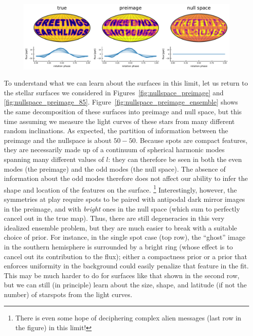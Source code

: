 \documentclass[modern]{aastex62}
\begin{document}
\begin{figure}[p!]
\begin{centering}
        \\[1em]
        \includegraphics[width=\linewidth]{figures/nullspace_preimage_d.pdf}
    \end{centering}
\end{figure}

To understand what we can learn about the surfaces in this limit, let us
return to the stellar surfaces we considered in Figures~\ref{fig:nullspace_preimage}
and \ref{fig:nullspace_preimage_85}.
Figure~\ref{fig:nullspace_preimage_ensemble} shows the same decomposition of
these surfaces into preimage and null space, but this time assuming we measure
the light curves of these stars from many different random inclinations.
As expected, the partition of information between the preimage and the nullspace
is about $50{-}50$.
Because spots are compact features, they
are necessarily made up of a continuum of spherical harmonic modes spanning
many different values of $l$: they can therefore be seen in both the even
modes (the preimage) and the odd modes (the null space). The absence of
information about the odd modes therefore does not affect our ability to
infer the shape and location of the features on the surface.%
\footnote{
    There is even some hope of deciphering complex alien messages
    (last row in the figure) in this limit!
}
Interestingly, however,
the symmetries at play require spots to be paired with antipodal dark mirror
images in the preimage, and with \emph{bright} ones in the null space
(which sum to perfectly cancel out in the true map). Thus, there are still
degeneracies in this very idealized ensemble problem, but they are much easier to break
with a suitable choice of prior. For instance, in the single spot case
(top row), the ``ghost'' image in the southern hemisphere is surrounded by
a bright ring (whose effect is to cancel out its contribution to the flux);
either a compactness prior or a prior that enforces uniformity in the
background could easily penalize that feature in the fit. This may be
much harder to do for surfaces like that shown in the second row, but
we can still (in principle) learn about the size, shape, and latitude
(if not the number) of starspots from the light curves.
\end{document}
